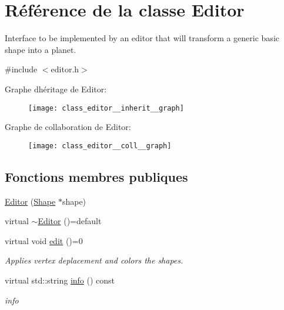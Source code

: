 \hypertarget{class_editor}{}\section{Référence de la classe Editor}
\label{class_editor}


Interface to be implemented by an editor that will transform a generic basic shape into a planet.  




{\ttfamily \#include $<$editor.\+h$>$}



Graphe d\textquotesingle{}héritage de Editor\+:\nopagebreak
\begin{figure}[H]
\begin{center}
\leavevmode
\texttt{[image: class\_editor\_\_inherit\_\_graph]}
\end{center}
\end{figure}


Graphe de collaboration de Editor\+:\nopagebreak
\begin{figure}[H]
\begin{center}
\leavevmode
\texttt{[image: class\_editor\_\_coll\_\_graph]}
\end{center}
\end{figure}
\subsection*{Fonctions membres publiques}
\begin{DoxyCompactItemize}
\item 
\hyperlink{class_editor_aea7f803e3bbb79dbbeb9a9ad9b01ed5a}{Editor} (\hyperlink{class_shape}{Shape} $\ast$shape)
\item 
virtual \hyperlink{class_editor_a192c911dff4ebca89d0b1bb3aa482253}{$\sim$\+Editor} ()=default
\item 
virtual void \hyperlink{class_editor_abca97ba11536c494a0c26bac77917792}{edit} ()=0
\begin{DoxyCompactList}\small\item\em Applies vertex deplacement and colors the shapes. \end{DoxyCompactList}\item 
virtual std\+::string \hyperlink{class_editor_a5747cd74b71d67f6d39b094071058382}{info} () const
\begin{DoxyCompactList}\small\item\em info \end{DoxyCompactList}\end{DoxyCompactItemize}
